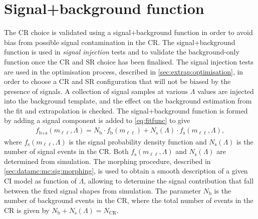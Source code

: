 \section{Signal+background function}\label{sec:sigmodel}
The CR choice is validated using a signal+background function in order to avoid bias from possible signal contamination in the CR. The signal+background function is used in \emph{signal injection} tests and to validate the background-only function once the CR and SR choice has been finalised. The signal injection tests are used in the optimisation process, described in \cref{sec:extrap:optimisation}, in order to choose a CR and SR configuration that will not be biased by the presence of signals. A collection of signal samples at various $\Lambda$ values are injected into the background template, and the effect on the background estimation from the fit and extrapolation is checked. The signal+background function is formed by adding a signal component is added to \cref{eq:fitfunc} to give
\begin{equation}
    \label{eq:sbfunction}
    \begin{aligned}
    f_\textrm{b+s}(m_{\ell\ell},\Lambda) = N_\textrm{b}\cdot f_\textrm{b}(m_{\ell\ell}) + N_\textrm{s}(\Lambda)\cdot f_\textrm{s}(m_{\ell\ell},\Lambda),
    \end{aligned} 
\end{equation}
where $f_\textrm{s}(m_{\ell\ell},\Lambda)$ is the signal probability density function and $N_\textrm{s}(\Lambda)$ is the number of signal events in the CR. Both $f_\textrm{s}(m_{\ell\ell},\Lambda)$ and $N_\textrm{s}(\Lambda)$ are determined from simulation. The morphing procedure, described in \cref{sec:datamc:mc:sig:morphing}, is used to obtain a smooth description of a given CI model as function of $\Lambda$, allowing to determine the signal contribution that fall between the fixed signal shapes from simulation. The parameter $N_\textrm{b}$ is the number of background events in the CR, where the total number of events in the CR is given by $N_\textrm{b}+N_\textrm{s}(\Lambda)=N_\textrm{CR}$. 

